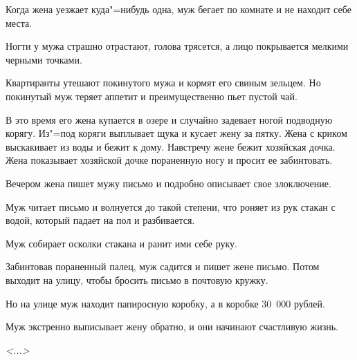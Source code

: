 Когда жена уезжает куда"=нибудь одна, муж бегает по комнате и не находит себе места.

Ногти у мужа страшно отрастают, голова трясется, а лицо покрывается мелкими черными точками.

Квартиранты утешают покинутого мужа и кормят его свиным зельцем. Но покинутый муж теряет аппетит и преимущественно пьет пустой чай.

В это время его жена купается в озере и случайно задевает ногой подводную корягу. Из"=под коряги выплывает щука и кусает жену за пятку. Жена с криком выскакивает из воды и бежит к дому. Навстречу жене бежит хозяйская дочка. Жена показывает хозяйской дочке пораненную ногу и просит ее забинтовать.

Вечером жена пишет мужу письмо и подробно описывает свое злоключение.

Муж читает письмо и волнуется до такой степени, что роняет из рук стакан с водой, который падает на пол и разбивается.

Муж собирает осколки стакана и ранит ими себе руку.

Забинтовав пораненный палец, муж садится и пишет жене письмо. Потом выходит на улицу, чтобы бросить письмо в почтовую кружку.

Но на улице муж находит папиросную коробку, а в коробке 30~000 рублей.

Муж экстренно выписывает жену обратно, и они начинают счастливую жизнь.

\vspace{1em}
\hfill \emph{<...>}
